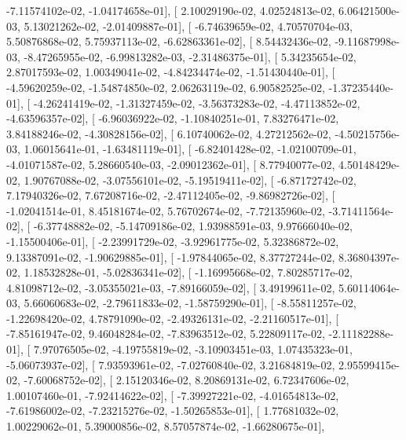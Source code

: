 \documentclass{article}
\begin{document}
         -7.11574102e-02,  -1.04174658e-01],
       [  2.10029190e-02,   4.02524813e-02,   6.06421500e-03,
          5.13021262e-02,  -2.01409887e-01],
       [ -6.74639659e-02,   4.70570704e-03,   5.50876868e-02,
          5.75937113e-02,  -6.62863361e-02],
       [  8.54432436e-02,  -9.11687998e-03,  -8.47265955e-02,
         -6.99813282e-03,  -2.31486375e-01],
       [  5.34235654e-02,   2.87017593e-02,   1.00349041e-02,
         -4.84234474e-02,  -1.51430440e-01],
       [ -4.59620259e-02,  -1.54874850e-02,   2.06263119e-02,
          6.90582525e-02,  -1.37235440e-01],
       [ -4.26241419e-02,  -1.31327459e-02,  -3.56373283e-02,
         -4.47113852e-02,  -4.63596357e-02],
       [ -6.96036922e-02,  -1.10840251e-01,   7.83276471e-02,
          3.84188246e-02,  -4.30828156e-02],
       [  6.10740062e-02,   4.27212562e-02,  -4.50215756e-03,
          1.06015641e-01,  -1.63481119e-01],
       [ -6.82401428e-02,  -1.02100709e-01,  -4.01071587e-02,
          5.28660540e-03,  -2.09012362e-01],
       [  8.77940077e-02,   4.50148429e-02,   1.90767088e-02,
         -3.07556101e-02,  -5.19519411e-02],
       [ -6.87172742e-02,   7.17940326e-02,   7.67208716e-02,
         -2.47112405e-02,  -9.86982726e-02],
       [ -1.02041514e-01,   8.45181674e-02,   5.76702674e-02,
         -7.72135960e-02,  -3.71411564e-02],
       [ -6.37748882e-02,  -5.14709186e-02,   1.93988591e-03,
          9.97666040e-02,  -1.15500406e-01],
       [ -2.23991729e-02,  -3.92961775e-02,   5.32386872e-02,
          9.13387091e-02,  -1.90629885e-01],
       [ -1.97844065e-02,   8.37727244e-02,   8.36804397e-02,
          1.18532828e-01,  -5.02836341e-02],
       [ -1.16995668e-02,   7.80285717e-02,   4.81098712e-02,
         -3.05355021e-03,  -7.89166059e-02],
       [  3.49199611e-02,   5.60114064e-03,   5.66060683e-02,
         -2.79611833e-02,  -1.58759290e-01],
       [ -8.55811257e-02,  -1.22698420e-02,   4.78791090e-02,
         -2.49326131e-02,  -2.21160517e-01],
       [ -7.85161947e-02,   9.46048284e-02,  -7.83963512e-02,
          5.22809117e-02,  -2.11182288e-01],
       [  7.97076505e-02,  -4.19755819e-02,  -3.10903451e-03,
          1.07435323e-01,  -5.06073937e-02],
       [  7.93593961e-02,  -7.02760840e-02,   3.21684819e-02,
          2.95599415e-02,  -7.60068752e-02],
       [  2.15120346e-02,   8.20869131e-02,   6.72347606e-02,
          1.00107460e-01,  -7.92414622e-02],
       [ -7.39927221e-02,  -4.01654813e-02,  -7.61986002e-02,
         -7.23215276e-02,  -1.50265853e-01],
       [  1.77681032e-02,   1.00229062e-01,   5.39000856e-02,
          8.57057874e-02,  -1.66280675e-01],
\end{document}
